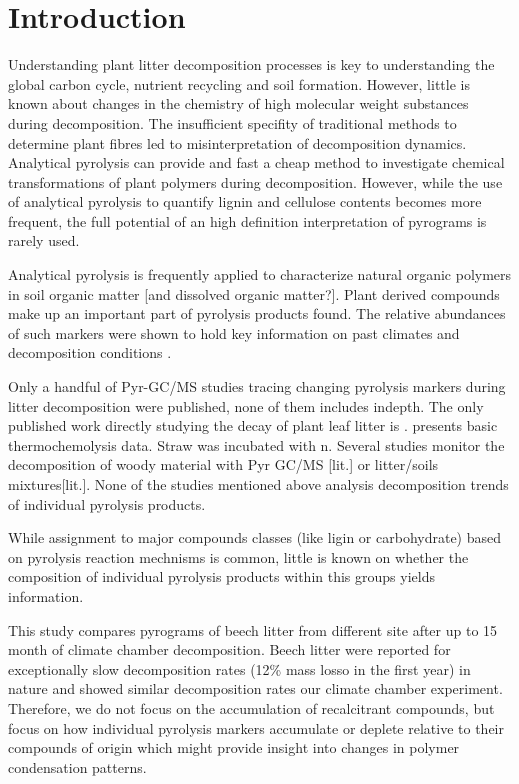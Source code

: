 \documentclass[preprint,review,12pt]{elsarticle}
\begin{document}
\section{Introduction}

Understanding plant litter decomposition processes is key to understanding the global carbon cycle, nutrient recycling and soil formation\citep{Prescott2010}. However, little is known about changes in the chemistry of high molecular weight substances during decomposition. The insufficient specifity of traditional methods to determine plant fibres\citep{Hatfield2005} led to misinterpretation of decomposition dynamics. Analytical pyrolysis can provide and fast a cheap method to investigate chemical transformations of plant polymers during decomposition. However, while the use of analytical pyrolysis to quantify lignin and cellulose contents becomes more frequent, the full potential of an high definition interpretation of pyrograms is rarely used.

Analytical pyrolysis is frequently applied to characterize natural organic polymers in soil organic matter [and dissolved organic matter?]. Plant derived compounds make up an important part of pyrolysis products found. The relative abundances of such markers were shown to hold key information on past climates and decomposition conditions \cite{Kuder1998, Schellekens2009, Schellekens2011}.

Only a handful of Pyr-GC/MS studies tracing changing pyrolysis markers during litter decomposition were published, none of them includes indepth. The only published work directly studying the decay of plant leaf litter is \cite{Franchini2002}. \cite{Snajdr2010} presents basic thermochemolysis data.  Straw was incubated with n. Several studies monitor the decomposition of woody material with Pyr GC/MS [lit.] or litter/soils mixtures[lit.]. None of the studies mentioned above analysis decomposition trends of individual pyrolysis products.

While assignment to major compounds classes (like ligin or carbohydrate) based on pyrolysis reaction mechnisms is common, little is known on whether the composition of individual pyrolysis products within this groups yields information.

This study compares pyrograms of beech litter from different site after up to 15 month of climate chamber decomposition. Beech litter were reported for exceptionally slow decomposition rates (12\% mass losso in the first year) in nature \citep{Klotzbucher2007} and showed similar decomposition rates our climate chamber experiment. Therefore, we do not focus on the accumulation of recalcitrant compounds, but focus on how individual pyrolysis markers accumulate or deplete relative to their compounds of origin which might provide insight into changes in polymer condensation patterns.
\end{document}
